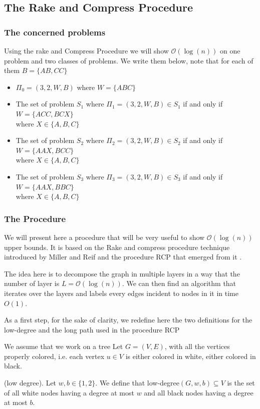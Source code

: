\subsection{The Rake and Compress Procedure}
\subsubsection{The concerned problems}
Using the rake and Compress Procedure we will show $\mathcal{O}(\log(n))$ on one problem and two classes of problems.
We write them below, note that for each of them $B=\{AB,CC\}$
\begin{itemize}
    \item $\Pi_0 = (3,2,W,B)$ where $W = \{ABC\}$
    \item The set of problem $S_1$ where $\Pi_1 = (3,2,W,B)\in S_1$ if and only if $W = \{ACC,BCX\}$\\where $X\in \{A,B,C\}$
    \item The set of problem $S_2$ where $\Pi_2 = (3,2,W,B)\in S_2$ if and only if $W = \{AAX,BCC\}$\\where $X \in \{A,B,C\}$
    \item The set of problem $S_3$ where $\Pi_3 = (3,2,W,B)\in S_3$ if and only if $W = \{AAX,BBC\}$\\where $X \in \{A,B,C\}$
\end{itemize}
\subsubsection{The Procedure}
We will present here a procedure that will be very useful to show $\mathcal{O}(\log(n))$ upper bounds. It is based on the Rake and compress procedure technique introduced by Miller and Reif \cite{RC} and the procedure RCP that emerged from it \cite{1}.

The idea here is to decompose the graph in multiple layers in a way that the number of layer is $L = \mathcal{O}(\log(n))$. We can then find an algorithm that iterates over the layers and labels every edges incident to nodes in it in time $O(1)$.

As a first step, for the sake of clarity, we redefine here the two definitions for the low-degree and the long path used in the procedure RCP \cite[p.21]{1}

We assume that we work on a tree Let $G = (V,E)$, with all the vertices properly colored, i.e. each vertex $u\in V$ is either colored in white, either colored in black.

\begin{defi} (low degree).
Let $w,b \in \{1,2\}$. We define that low-degree$(G,w,b)\subseteq V$ is the set of all white nodes having a degree at most $w$ and all black nodes having a degree at most $b$.
\end{defi}

